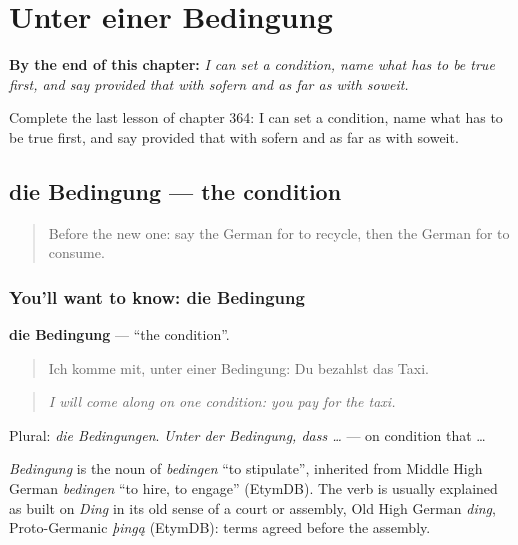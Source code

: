 
\chapter{Unter einer Bedingung}
\label{ch:ge-unter-einer-bedingung}

\begin{chapteropening}
\textbf{By the end of this chapter:} \emph{I can set a condition, name what has to be true first, and say provided that with sofern and as far as with soweit.}

Complete the last lesson of chapter 364: I can set a condition, name what has to be true first, and say provided that with sofern and as far as with soweit.
\end{chapteropening}

\section[die Bedingung]{die Bedingung — the condition}

\label{lesson:GE-C364-bedingung}



\begin{quote}
Before the new one: say the German for to recycle, then the German for to consume.
\end{quote}

\subsection*{You'll want to know: die Bedingung}
\textbf{die Bedingung} — \textquotedblleft{}the condition\textquotedblright{}.

\begin{quote}
Ich komme mit, unter einer Bedingung: Du bezahlst das Taxi.
\end{quote}

\begin{quote}
\emph{I will come along on one condition: you pay for the taxi.}
\end{quote}

Plural: \emph{die Bedingungen}. \emph{Unter der Bedingung, dass …} — on condition that …

\begin{cousinweb}
\emph{Bedingung} is the noun of \emph{bedingen} \textquotedblleft{}to stipulate\textquotedblright{}, inherited from Middle High German \emph{bedingen} \textquotedblleft{}to hire, to engage\textquotedblright{} (EtymDB). The verb is usually explained as built on \emph{Ding} in its old sense of a court or assembly, Old High German \emph{ding}, Proto-Germanic \emph{þingą} (EtymDB): terms agreed before the assembly.
\end{cousinweb}

